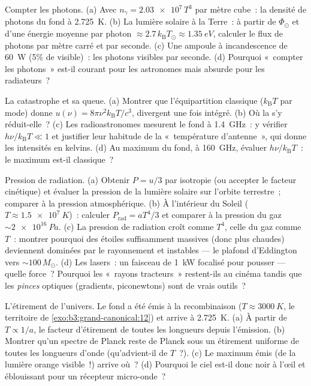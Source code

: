 \begin{exercise}[$\star$]\label{exo:b3:photons-phonons:3}
Compter les photons. (a) Avec $n_\gamma = \num{2.03e7}\,T^3$ par
mètre cube~: la densité de photons du fond à \qty{2.725}{K}.
(b) La lumière solaire à la Terre~: à partir de $\Phi_\odot$ et
d'une énergie moyenne par photon
$\approx 2.7\,k_{\text{B}}T_\odot \approx \qty{1.35}{eV}$,
calculer le flux de photons par mètre carré et par seconde. (c) Une
ampoule à incandescence de \qty{60}{W} (5\% de visible)~: les
photons visibles par seconde. (d) Pourquoi «~compter les photons~»
est-il courant pour les astronomes mais absurde pour les
radiateurs~?
\end{exercise}

\begin{exercise}[$\star$]\label{exo:b3:photons-phonons:4}
La catastrophe et sa queue. (a) Montrer que l'équipartition
classique ($k_{\text{B}}T$ par mode) donne $u(\nu) =
8\pi\nu^2k_{\text{B}}T/c^3$, divergent une fois intégré. (b) Où la
 s'y réduit-elle~? (c) Les radioastronomes mesurent le
fond à \qty{1.4}{GHz}~: y vérifier $h\nu/k_{\text{B}}T \ll 1$ et
justifier leur habitude de la «~température d'antenne~», qui donne
les intensités en kelvins. (d) Au maximum du fond, à
\qty{160}{GHz}, évaluer $h\nu/k_{\text{B}}T$~: le maximum est-il
classique~?
\end{exercise}

\begin{exercise}[$\star\star$]\label{exo:b3:photons-phonons:5}
Pression de radiation. (a) Obtenir $P = u/3$ par isotropie (ou
accepter le facteur cinétique) et évaluer la pression de la lumière
solaire sur l'orbite terrestre~; comparer à la pression
atmosphérique. (b) À l'intérieur du Soleil
($T \approx \qty{1.5e7}{K}$)~: calculer $P_{\text{rad}} =
aT^4/3$ et comparer à la pression du gaz $\sim\qty{2e16}{Pa}$.
(c) La pression de radiation croît comme $T^4$, celle du gaz comme
$T$~: montrer pourquoi des étoiles suffisamment massives (donc plus
chaudes) deviennent dominées par le rayonnement et instables --- le
plafond d'Eddington vers $\sim100\,M_\odot$. (d) Les lasers~: un
faisceau de \qty{1}{kW} focalisé pour pousser --- quelle force~?
Pourquoi les «~rayons tracteurs~» restent-ils au cinéma tandis que
les \emph{pinces} optiques (gradients, piconewtons) sont de vrais
outils~?
\end{exercise}

\begin{exercise}[$\star\star$]\label{exo:b3:photons-phonons:6}
L'étirement de l'univers. Le fond a été émis à la recombinaison
($T \approx \qty{3000}{K}$, le territoire de
\cref{exo:b3:grand-canonical:12}) et arrive à \qty{2.725}{K}. (a) À
partir de $T \propto
1/a$, le facteur d'étirement de toutes les longueurs depuis
l'émission. (b) Montrer qu'un spectre de Planck reste de Planck sous
un étirement uniforme de toutes les longueurs d'onde (qu'advient-il
de $T$~?). (c) Le maximum émis (de la lumière orange visible~!)
arrive où~? (d) Pourquoi le ciel est-il donc noir à l'œil et
éblouissant pour un récepteur micro-onde~?
\end{exercise}

